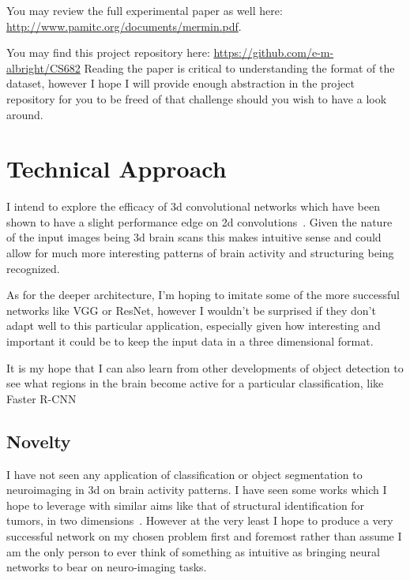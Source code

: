 \documentclass[10pt,twocolumn,letterpaper]{article}
\begin{document}
You may review the full experimental paper as well here: \url{http://www.pamitc.org/documents/mermin.pdf}.

You may find this project repository here: \url{https://github.com/e-m-albright/CS682}
Reading the paper is critical to understanding the format of the dataset, however I hope I will provide enough
abstraction in the project repository for you to be freed of that challenge should you wish to have a look around.



\section{Technical Approach}\label{sec:technical-approach}
I intend to explore the efficacy of 3d convolutional networks which have been shown to have a slight performance
edge on 2d convolutions~\cite{payan2015predicting}.
Given the nature of the input images being 3d brain scans this makes intuitive sense and could allow for much more
interesting patterns of brain activity and structuring being recognized.

As for the deeper architecture, I'm hoping to imitate some of the more successful networks like VGG or ResNet,
however I wouldn't be surprised if they don't adapt well to this particular application, especially given how
interesting and important it could be to keep the input data in a three dimensional format.

It is my hope that I can also learn from other developments of object detection to see what regions in the
brain become active for a particular classification, like Faster R-CNN

\subsection{Novelty}\label{subsec:novelty}

I have not seen any application of classification or object segmentation to neuroimaging in 3d
on brain activity patterns.
I have seen some works which I hope to leverage with similar aims like that of structural identification
for tumors, in two dimensions~\cite{akkus2017deep}.
However at the very least I hope to produce a very successful network on my chosen problem first and foremost rather
than assume I am the only person to ever think of something as intuitive as bringing neural networks to bear
on neuro-imaging tasks.
\end{document}
